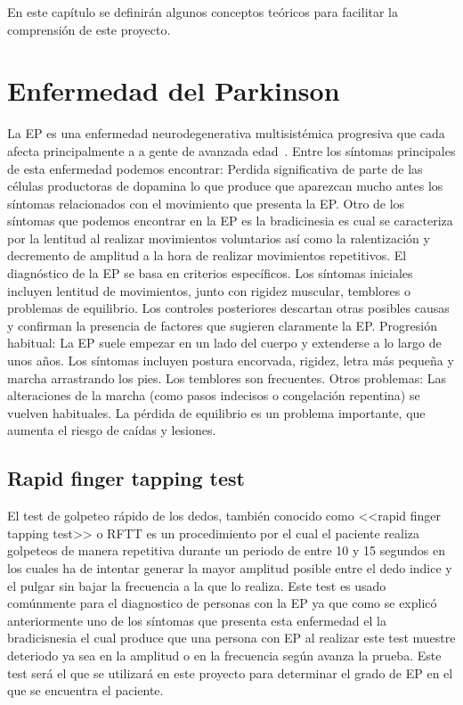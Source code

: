 
En este capítulo se definirán algunos conceptos teóricos para facilitar la comprensión de este proyecto.

\section{Enfermedad del Parkinson}

La EP es una  enfermedad neurodegenerativa multisistémica progresiva que cada afecta principalmente a a gente de avanzada edad~\cite{pdsymptoms}.  
Entre los síntomas principales de esta enfermedad podemos encontrar:
Perdida significativa de parte de las células productoras de dopamina lo que produce que aparezcan mucho antes los síntomas relacionados con el movimiento que presenta la EP. Otro de los síntomas que podemos encontrar en la EP es la bradicinesia es cual se caracteriza por la lentitud al realizar movimientos voluntarios así como la ralentización y decremento de amplitud a la hora de realizar movimientos repetitivos.
El diagnóstico de la EP se basa en criterios específicos. Los síntomas iniciales incluyen lentitud de movimientos, junto con rigidez muscular, temblores o problemas de equilibrio. Los controles posteriores descartan otras posibles causas y confirman la presencia de factores que sugieren claramente la EP.
Progresión habitual: La EP suele empezar en un lado del cuerpo y extenderse a lo largo de unos años. Los síntomas incluyen postura encorvada, rigidez, letra más pequeña y marcha arrastrando los pies. Los temblores son frecuentes.
Otros problemas: Las alteraciones de la marcha (como pasos indecisos o congelación repentina) se vuelven habituales. La pérdida de equilibrio es un problema importante, que aumenta el riesgo de caídas y lesiones.

\subsection{Rapid finger tapping test}

El test de golpeteo rápido de los dedos, también conocido como <<rapid finger tapping test>> o RFTT es un procedimiento por el cual el paciente realiza golpeteos de manera repetitiva durante un periodo de entre 10 y 15 segundos en los cuales ha de intentar generar la mayor amplitud posible entre el dedo indice y el pulgar sin bajar la frecuencia a la que lo realiza. Este test es usado comúnmente para el diagnostico de personas con la EP ya que como se explicó anteriormente uno de los síntomas que presenta esta enfermedad el la bradicisnesia el cual produce que una persona con EP al realizar este test muestre deteriodo ya sea en la amplitud o en la frecuencia según avanza la prueba. Este test será el que se utilizará en este proyecto para determinar el grado de EP en el que se encuentra el paciente.

